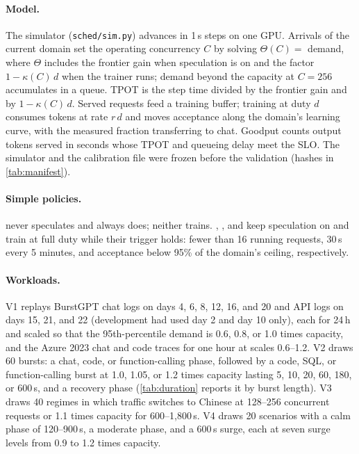 \paragraph{Model.} The simulator (\texttt{sched/sim.py}) advances in 1\,s steps on one GPU. Arrivals of the current domain set the operating concurrency $C$ by solving $\Theta(C)=$ demand, where $\Theta$ includes the frontier gain when speculation is on and the factor $1-\kappa(C)\,d$ when the trainer runs; demand beyond the capacity at $C{=}256$ accumulates in a queue. TPOT is the step time divided by the frontier gain and by $1-\kappa(C)\,d$. Served requests feed a training buffer; training at duty $d$ consumes tokens at rate $r\,d$ and moves acceptance along the domain's learning curve, with the measured fraction transferring to chat. Goodput counts output tokens served in seconds whose TPOT and queueing delay meet the SLO. The simulator and the calibration file were frozen before the validation (hashes in \cref{tab:manifest}).

\paragraph{Simple policies.}  never speculates and  always does; neither trains. , , and  keep speculation on and train at full duty while their trigger holds: fewer than 16 running requests, 30\,s every 5 minutes, and acceptance below 95\% of the domain's ceiling, respectively.

\paragraph{Workloads.} V1 replays BurstGPT \citep{wang2024burstgpt} chat logs on days 4, 6, 8, 12, 16, and 20 and API logs on days 15, 21, and 22 (development had used day 2 and day 10 only), each for 24\,h and scaled so that the 95th-percentile demand is 0.6, 0.8, or 1.0 times capacity, and the Azure 2023 chat and code traces \citep{patel2024splitwise} for one hour at scales 0.6--1.2. V2 draws 60 bursts: a chat, code, or function-calling phase, followed by a code, SQL, or function-calling burst at 1.0, 1.05, or 1.2 times capacity lasting 5, 10, 20, 60, 180, or 600\,s, and a recovery phase (\cref{tab:duration} reports it by burst length). V3 draws 40 regimes in which traffic switches to Chinese at 128--256 concurrent requests or 1.1 times capacity for 600--1{,}800\,s. V4 draws 20 scenarios with a calm phase of 120--900\,s, a moderate phase, and a 600\,s surge, each at seven surge levels from 0.9 to 1.2 times capacity.

